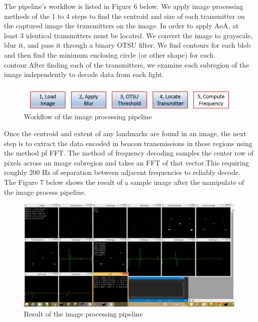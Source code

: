 \documentclass[a4paper, 11pt]{article} %
\begin{document}
The pipeline's workflow is listed in Figure 6 below. We apply image processing methods of the 1 to 4 steps to find the centroid and size of each transmitter on the captured image the transmitters on the image. In order to apply AoA, at least 3 identical transmitters must be located. We convert the image to grayscale, blur it, and pass it through a binary OTSU filter. We find contours for each blob and then find the minimum enclosing circle (or other shape) for each contour.After finding each of the transmitters, we examine each subregion of the image independently to decode data from each light.

\begin{figure}[h]
	\centering 
	\includegraphics[width=0.8\linewidth]{Figure6.png}
	\caption{Workflow of the image processing pipeline}
	\label{fig:subfig}
\end{figure}

Once the centroid and extent of any landmarks are found in an image, the next step is to extract the data encoded in beacon transmissions in these regions using the method pf FFT. The method of frequency decoding samples the center row of pixels across an image subregion and takes an FFT of that vector.This requiring roughly 200 Hz of separation between adjacent frequencies to reliably decode. The Figure 7 below shows the result of a sample image after the manipulate of the image process pipeline.
\begin{figure}[h]
 	\centering 
 	\includegraphics[width=0.8\linewidth]{Figure7.png}
 	\caption{Result of the image processing pipeline}
 	\label{fig:subfig}
\end{figure}
\end{document}
